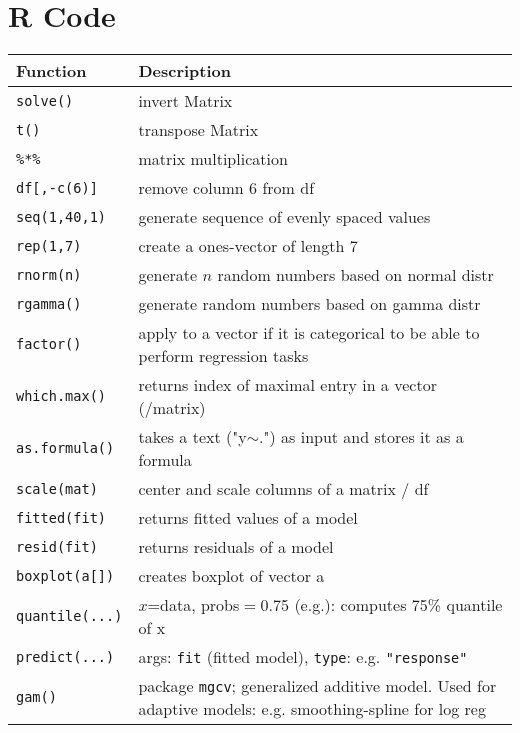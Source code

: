 \section{R Code}

\vspace{-5pt}


\begin{tabularx}{0.495\textwidth} {l|X}
    \hline
    Function & Description \\ \hline
    \texttt{solve()} & invert Matrix \\
    \texttt{t()} & transpose Matrix \\
    \texttt{\%*\%} & matrix multiplication \\
    \texttt{df[,-c(6)]} & remove column 6 from df \\
    \texttt{seq(1,40,1)} & generate sequence of evenly spaced values \\
    \texttt{rep(1,7)} & create a ones-vector of length 7 \\
    \texttt{rnorm(n)} & generate $n$ random numbers based on normal distr \\
    \texttt{rgamma()} & generate random numbers based on gamma distr \\
    \texttt{factor()} & apply to a vector if it is categorical to be able to perform regression tasks \\
    \texttt{which.max()} & returns index of maximal entry in a vector (/matrix) \\
    \texttt{as.formula()} & takes a text ("y$\sim$.") as input and stores it as a formula \\
    \texttt{scale(mat)} & center and scale columns of a matrix / df \\
    \texttt{fitted(fit)} & returns fitted values of a model \\
    \texttt{resid(fit)} & returns residuals of a model \\
    \texttt{boxplot(a[])} & creates boxplot of vector a \\
    \texttt{quantile(...)} & $x$=data, probs$=$0.75 (e.g.): computes 75\% quantile of x \\
    \texttt{predict(...)} & args: \texttt{fit} (fitted model), \texttt{type}: e.g. \texttt{"response"} \\
    \texttt{gam()} & package \texttt{mgcv}; generalized additive model. Used for adaptive models: e.g. smoothing-spline for log reg \\

\end{tabularx}
